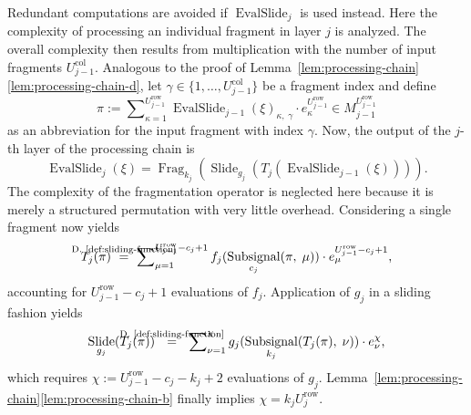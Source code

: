 \documentclass[journal]{IEEEtran}
\newcommand{\discint}[2]{\{#1,\dotsc,#2\}}
\newcommand{\inint}[2]{\in\discint{#1}{#2}}
\DeclareMathOperator{\Subsignal}{Subsignal}
\DeclareMathOperator{\Slide}{Slide}
\DeclareMathOperator{\Fragmentation}{Frag}
\DeclareMathOperator{\EvalSlide}{EvalSlide}
\newcommand{\row}{\operatorname{row}}
\newcommand{\col}{\operatorname{col}}
\newcommand{\equsing}[1]{\overset{\mathclap{\text{#1}}}{=}}
\begin{document}
Redundant computations are avoided if $\EvalSlide_j$ is used instead.
Here the complexity of processing an individual fragment in layer $j$ is analyzed.
The overall complexity then results from multiplication with the number of input fragments $U_{j - 1}^{\col}$.
Analogous to the proof of Lemma~\ref{lem:processing-chain}\ref{lem:processing-chain-d}, let $\gamma\inint{1}{U_{j - 1}^{\col}}$ be a fragment index and define
\begin{displaymath}
  \pi := \sum\nolimits_{\kappa = 1}^{U_{j - 1}^{\row}} \EvalSlide_{j - 1}(\xi)_{\kappa,\;\gamma}\cdot e_{\kappa}^{U_{j - 1}^{\row}}\in M_{j - 1}^{U_{j - 1}^{\row}}
\end{displaymath}
as an abbreviation for the input fragment with index $\gamma$.
Now, the output of the $j$-th layer of the processing chain is
\begin{displaymath}
  \EvalSlide_j(\xi) = \Fragmentation_{k_j}(\Slide_{g_j}(T_j(\EvalSlide_{j - 1}(\xi))))\text{.}
\end{displaymath}
The complexity of the fragmentation operator is neglected here because it is merely a structured permutation with very little overhead.
Considering a single fragment now yields
\begin{displaymath}
  T_j(\pi)\ \equsing{D.~\ref{def:sliding-function}}\ \sum\nolimits_{\mu = 1}^{U_{j - 1}^{\row} - c_j + 1} f_j(\Subsignal_{c_j}(\pi,\;\mu))\cdot e_\mu^{U_{j - 1}^{\row} - c_j + 1}\text{,}
\end{displaymath}
accounting for $U_{j - 1}^{\row} - c_j + 1$ evaluations of $f_j$.
Application of $g_j$ in a sliding fashion yields
\begin{displaymath}
  \Slide_{g_j}(T_j(\pi))\ \ \equsing{D.~\ref{def:sliding-function}}\ \ \sum\nolimits_{\nu = 1}^{\chi} g_j(\Subsignal_{k_j}(T_j(\pi),\;\nu))\cdot e_\nu^{\chi}\text{,}
\end{displaymath}
which requires $\chi := U_{j - 1}^{\row} - c_j - k_j + 2$ evaluations of $g_j$.
Lemma~\ref{lem:processing-chain}\ref{lem:processing-chain-b} finally implies $\chi = k_j U_j^{\row}$.
\end{document}

